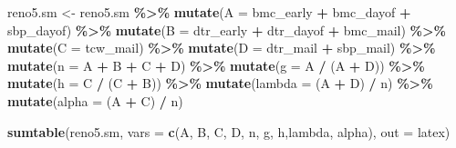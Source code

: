 \documentclass[10pt]{article}
\newenvironment{Shaded}{\begin{snugshade}}{\end{snugshade}}
\newcommand{\AttributeTok}[1]{\textcolor[rgb]{0.13,0.29,0.53}{#1}}
\newcommand{\FunctionTok}[1]{\textcolor[rgb]{0.13,0.29,0.53}{\textbf{#1}}}
\newcommand{\NormalTok}[1]{#1}
\newcommand{\OtherTok}[1]{\textcolor[rgb]{0.56,0.35,0.01}{#1}}
\newcommand{\SpecialCharTok}[1]{\textcolor[rgb]{0.81,0.36,0.00}{\textbf{#1}}}
\newcommand{\StringTok}[1]{\textcolor[rgb]{0.31,0.60,0.02}{#1}}
\begin{document}
\begin{Shaded}
\begin{Highlighting}[]
\NormalTok{reno5.sm }\OtherTok{\textless{}{-}}\NormalTok{ reno5.sm }\SpecialCharTok{\%\textgreater{}\%}
  \FunctionTok{mutate}\NormalTok{(}\AttributeTok{A =}\NormalTok{ bmc\_early }\SpecialCharTok{+}\NormalTok{ bmc\_dayof }\SpecialCharTok{+}\NormalTok{ sbp\_dayof) }\SpecialCharTok{\%\textgreater{}\%}
  \FunctionTok{mutate}\NormalTok{(}\AttributeTok{B =}\NormalTok{ dtr\_early }\SpecialCharTok{+}\NormalTok{ dtr\_dayof }\SpecialCharTok{+}\NormalTok{ bmc\_mail) }\SpecialCharTok{\%\textgreater{}\%}
  \FunctionTok{mutate}\NormalTok{(}\AttributeTok{C =}\NormalTok{ tcw\_mail) }\SpecialCharTok{\%\textgreater{}\%}
  \FunctionTok{mutate}\NormalTok{(}\AttributeTok{D =}\NormalTok{ dtr\_mail }\SpecialCharTok{+}\NormalTok{ sbp\_mail) }\SpecialCharTok{\%\textgreater{}\%}
  \FunctionTok{mutate}\NormalTok{(}\AttributeTok{n =}\NormalTok{ A }\SpecialCharTok{+}\NormalTok{ B }\SpecialCharTok{+}\NormalTok{ C }\SpecialCharTok{+}\NormalTok{ D) }\SpecialCharTok{\%\textgreater{}\%}
  \FunctionTok{mutate}\NormalTok{(}\AttributeTok{g =}\NormalTok{ A }\SpecialCharTok{/}\NormalTok{ (A }\SpecialCharTok{+}\NormalTok{ D)) }\SpecialCharTok{\%\textgreater{}\%}
  \FunctionTok{mutate}\NormalTok{(}\AttributeTok{h =}\NormalTok{ C }\SpecialCharTok{/}\NormalTok{ (C }\SpecialCharTok{+}\NormalTok{ B)) }\SpecialCharTok{\%\textgreater{}\%}
  \FunctionTok{mutate}\NormalTok{(}\AttributeTok{lambda =}\NormalTok{ (A }\SpecialCharTok{+}\NormalTok{ D) }\SpecialCharTok{/}\NormalTok{ n) }\SpecialCharTok{\%\textgreater{}\%}
  \FunctionTok{mutate}\NormalTok{(}\AttributeTok{alpha =}\NormalTok{ (A }\SpecialCharTok{+}\NormalTok{ C) }\SpecialCharTok{/}\NormalTok{ n)}

\FunctionTok{sumtable}\NormalTok{(reno5.sm, }
         \AttributeTok{vars =} \FunctionTok{c}\NormalTok{(}\StringTok{\textquotesingle{}A\textquotesingle{}}\NormalTok{, }\StringTok{\textquotesingle{}B\textquotesingle{}}\NormalTok{, }\StringTok{\textquotesingle{}C\textquotesingle{}}\NormalTok{, }\StringTok{\textquotesingle{}D\textquotesingle{}}\NormalTok{, }\StringTok{\textquotesingle{}n\textquotesingle{}}\NormalTok{, }\StringTok{\textquotesingle{}g\textquotesingle{}}\NormalTok{, }\StringTok{\textquotesingle{}h\textquotesingle{}}\NormalTok{,}\StringTok{\textquotesingle{}lambda\textquotesingle{}}\NormalTok{, }\StringTok{\textquotesingle{}alpha\textquotesingle{}}\NormalTok{),}
         \AttributeTok{out =} \StringTok{\textquotesingle{}latex\textquotesingle{}}\NormalTok{)}
\end{Highlighting}
\end{Shaded}
\end{document}
